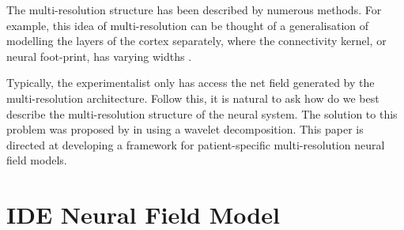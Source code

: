 \documentclass[review,authoryear,3p]{elsarticle}
\begin{document}
The multi-resolution structure has been described by numerous methods. For example, this idea of multi-resolution can be thought of a generalisation of modelling the layers of the cortex separately, where the connectivity kernel, or neural foot-print, has varying widths \citep{Wilson1973}.

Typically, the experimentalist only has access the net field generated by the multi-resolution architecture. Follow this, it is natural to ask how do we best describe the multi-resolution structure of the neural system. The solution to this problem was proposed by \citet{Breakspear2005} in using a wavelet decomposition. This paper is directed at developing a framework for patient-specific multi-resolution neural field models. 

\section{IDE Neural Field Model}
\singlespacing
\end{document}
